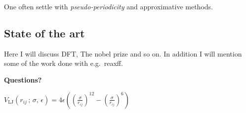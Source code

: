 \documentclass[
paper=128mm:96mm, %
fontsize=11pt, %
pagesize, %
parskip=half-, %
]{scrartcl} %
\theoremstyle{mythmstyle} %
\begin{document}
One often settle with \textit{pseudo-periodicity} and approximative methods.

\clearpage

\subsection{State of the art}

Here I will discuss DFT, The nobel prize and so on. In addition I will mention some of the work done with e.g.~reaxff.

\clearpage



\thispagestyle{empty} %

\begin{flushright}
\vspace{0.6cm}
\color{white}\sffamily
{\bfseries\LARGE Questions?\par} %
\vfill
\end{flushright}



\clearpage
$V_\mathrm{LJ}(r_{ij}\,;\,\sigma,\,\epsilon) = 4\epsilon \left(\left(\frac{\sigma}{r_{ij}}\right)^{12} - \left(\frac{\sigma}{r_{ij}}\right)^{6}\right)$


\end{document}
